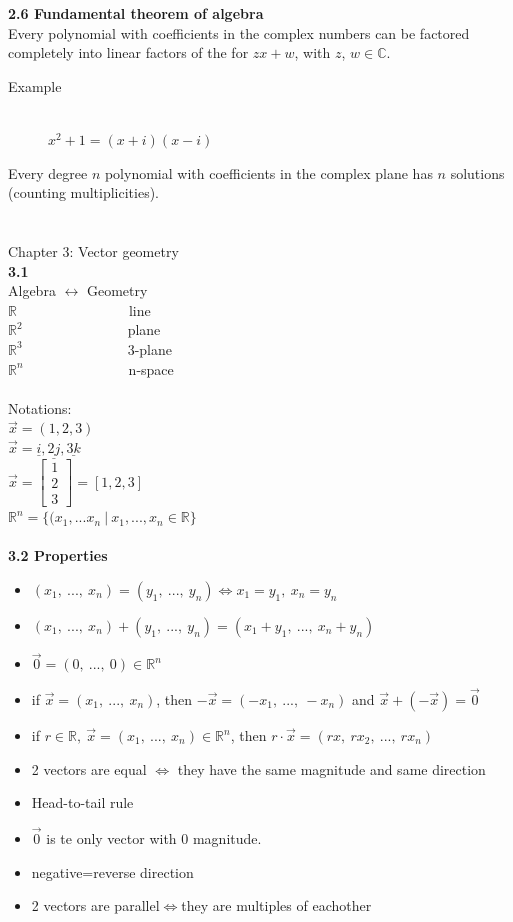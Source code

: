\documentclass[]{article}
\begin{document}
		\noindent\large{\bf 2.6 Fundamental theorem of algebra}\\
		\normalsize
		\noindent Every polynomial with coefficients in the complex numbers can be factored completely into linear factors of the for $zx+w$, with $z$, $w\in\mathbb{C}$.\\
		\begin{description}
			\item[Example]\hfill\\
				$x^2+1=(x+i)(x-i)$
		\end{description}
		Every degree $n$ polynomial with coefficients in the complex plane has $n$ solutions (counting multiplicities).\\\\
		\pagebreak\\
		\Large{Chapter 3: Vector geometry}\\
		\noindent\normalsize
		{\bf 3.1\\} 
		Algebra $\longleftrightarrow$ Geometry\\
		$\mathbb{R}$~~~~~~~~~~~~~~~~line\\
		$\mathbb{R}^2$~~~~~~~~~~~~~~~plane\\
		$\mathbb{R}^3$~~~~~~~~~~~~~~~3-plane\\
		$\mathbb{R}^n$~~~~~~~~~~~~~~~n-space\\\\
		Notations:\\
		$\vec{x}=(1,2,3)$\\
		$\vec{x}=\underline{i},\underline{2j},\underline{3k}$\\
		$\vec{x}=
		\begin{bmatrix}
			{1}\\
			{2}\\
			{3}
		\end{bmatrix}=[1,2,3]$\\
		$\mathbb{R}^n=\{(x_1,...x_n~|~x_1,...,x_n\in\mathbb{R} \}$\\\\
		{\bf 3.2 Properties}
		\begin{itemize}
			\item $(x_1,~...,~x_n)=(y_1,~...,~y_n)\Leftrightarrow x_1=y_1,~x_n=y_n$
			\item $(x_1,~...,~x_n)+(y_1,~...,~y_n)=(x_1+y_1,~...,~x_n+y_n)$
			\item $\vec{0}=(0,~...,~0)\in\mathbb{R}^n$
			\item if $\vec{x}=(x_1,~...,~x_n)$, then $-\vec{x}=(-x_1,~...,~-x_n)$ and $\vec{x}+(-\vec{x})=\vec{0}$
			\item if $r\in\mathbb{R},~\vec{x}=(x_1,~...,~x_n)\in\mathbb{R}^n$, then $r\cdot\vec{x}=(rx, ~rx_2,~...,~rx_n)$			
			\item 2 vectors are equal $\iff$ they have the same magnitude and same direction
			\item Head-to-tail rule
			\item $\vec{0}$ is te only vector with 0 magnitude.
			\item negative=reverse direction
			\item 2 vectors are parallel$\iff$they are multiples of eachother
		\end{itemize}
\end{document}
